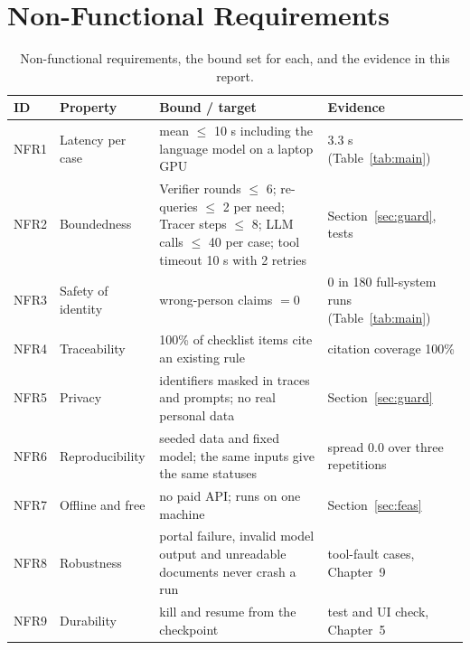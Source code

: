 \section{Non-Functional Requirements}
\begin{table}[H]
\centering\small{}
\caption[Non-functional requirements]{Non-functional requirements, the bound set for each, and the evidence in this report.}\label{tab:nfr}
\renewcommand{\arraystretch}{1.15}
\begin{tabularx}{\linewidth}{@{}l p{3.6cm} X l@{}}
\toprule
\textbf{ID} & \textbf{Property} & \textbf{Bound / target} & \textbf{Evidence} \\ \midrule
NFR1 & Latency per case & mean $\le$ 10 s including the language model on a laptop GPU & 3.3 s (Table~\ref{tab:main}) \\
NFR2 & Boundedness & Verifier rounds $\le$ 6; re-queries $\le$ 2 per need; Tracer steps $\le$ 8; LLM calls $\le$ 40 per case; tool timeout 10 s with 2 retries & Section~\ref{sec:guard}, tests \\
NFR3 & Safety of identity & wrong-person claims $=0$ & 0 in 180 full-system runs (Table~\ref{tab:main}) \\
NFR4 & Traceability & 100\% of checklist items cite an existing rule & citation coverage 100\% \\
NFR5 & Privacy & identifiers masked in traces and prompts; no real personal data & Section~\ref{sec:guard} \\
NFR6 & Reproducibility & seeded data and fixed model; the same inputs give the same statuses & spread 0.0 over three repetitions \\
NFR7 & Offline and free & no paid API; runs on one machine & Section~\ref{sec:feas} \\
NFR8 & Robustness & portal failure, invalid model output and unreadable documents never crash a run & tool-fault cases, Chapter~9 \\
NFR9 & Durability & kill and resume from the checkpoint & test and UI check, Chapter~5 \\ \bottomrule
\end{tabularx}
\end{table}


